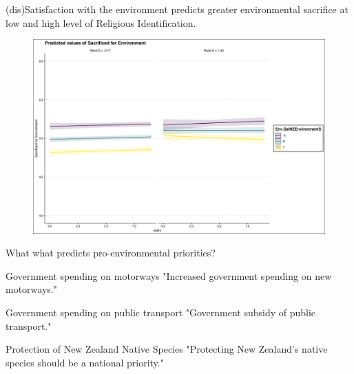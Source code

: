 \documentclass{beamer}
\begin{document}
\begin{frame}{(dis)Satisfaction with the environment predicts greater environmental sacrifice at low and high level of Religious Identification.}
\begin{figure}
\includegraphics[width=.8\textwidth,height=\textheight,keepaspectratio]{Figures/X_SACRIFICEMADE_Env.SatNZEnvironmentS_Relid.S.png}
\end{figure}
\end{frame}

\begin{frame}{What what predicts pro-environmental priorities?}

\begin{alertblock}{Government spending on motorways}
"Increased government spending on new motorways."
\end{alertblock}

\begin{alertblock}{Government spending on public transport}
"Government subsidy of public transport."
\end{alertblock}

\begin{alertblock}{Protection of New Zealand Native Species}
"Protecting New Zealand’s native species should be a national priority."
\end{alertblock}

    
\end{frame}
\end{document}
